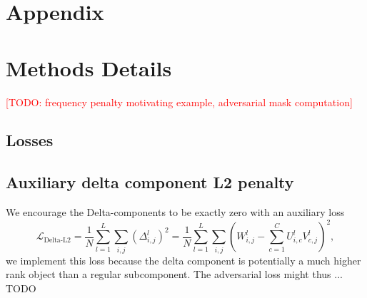 \documentclass{article}
\newcommand{\todo}[1]{\textcolor{red}{[TODO: #1]}}
\begin{document}
\appendix

\section{Appendix}




\section{Methods Details}
\label{app:methods}
\todo{frequency penalty motivating example, adversarial mask computation}

\subsection{Losses}
\subsection{Auxiliary delta component L2 penalty }
 We encourage the Delta-components to be exactly zero with an auxiliary loss
\begin{equation}
\mathcal{L}_{\text{Delta-L2}}=\frac{1}{N}\sum^L_{l=1}\sum_{i,j}\left(\Delta^l_{i,j}\right)^2=\frac{1}{N}\sum^L_{l=1}\sum_{i,j}{\left( W^{l}_{i,j}- \sum^C_{c=1} U^l_{i,c} V^l_{c,j}\right)}^2 ,
\end{equation}
we implement this loss because the delta component is potentially a much higher rank object than a regular subcomponent. The adversarial loss might thus ... TODO
\end{document}
